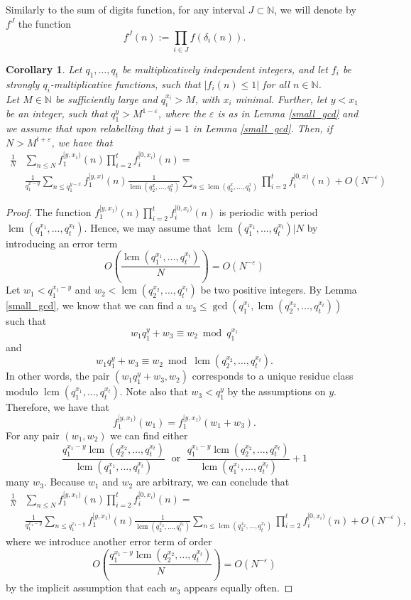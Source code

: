 \documentclass[12pt]{amsart}
\renewcommand{\leq}{\leqslant}
\DeclareMathOperator{\lcm}{lcm}
\newtheorem{corollary}[theorem]{Corollary}
\theoremstyle{definition}
\numberwithin{equation}{section}
\newcommand\NN{\mathbb{N}}
\numberwithin{equation}{section}
\begin{document}
Similarly to the sum of digits function, for any interval $J\subset\NN$, we will denote by $f^J$ the function
\[
	f^J(n):=  \prod_{i\in J}f(\delta_i(n)).
\]  
\begin{corollary}\label{cor_independence}
	Let $q_1,\dots,q_t$ be multiplicatively independent integers, and let $f_i$ be strongly $q_i$-multiplicative functions, such that $|f_i(n)\leq 1|$ for all $n\in \NN$.\\
	Let $M\in \NN$ be sufficiently large and $q_i^{x_i}>M$, with $x_i$ minimal. Further, let $y<x_1$ be an integer, such that $q_1^{y}>M^{1-\varepsilon}$, where the $\varepsilon$ is as in Lemma \ref{small_gcd} and we assume that upon relabelling that $j=1$ in Lemma \ref{small_gcd}. Then, if $N>M^{t+\varepsilon}$, we have that
	\begin{align*}
	    \frac 1N &\sum_{n\leq N}  f_1^{[y,x_1)}(n) \prod_{i=2}^t f_i^{[0,x_i)}(n) = \\
        &\frac 1{q_1^{x-y}}\sum_{n\leq q_1^{y-x}} f_1^{[y,x)}(n) \frac 1{\lcm(q_2^{x},\dots,q_t^{x})}\sum_{n\leq \lcm(q_2^{x},\dots,q_t^{x})} \prod_{i=2}^t f_i^{[0,x)}(n) + O(N^{-\varepsilon})
	\end{align*}
\end{corollary}
\begin{proof}
	The function $f_1^{[y,x_1)}(n) \prod_{i=2}^t f_i^{[0,x_i)}(n)$ is periodic with period $\lcm(q_1^{x_1},\dots,q_t^{x_t})$. Hence, we may assume that $\lcm(q_1^{x_1},\dots,q_t^{x_t})|N$ by introducing an error term
	\[
		O\left(\frac{\lcm(q_1^{x_1},\dots,q_t^{x_t})}{N}\right) = O(N^{-\varepsilon})
	\]
	Let $w_1<q_1^{x_1-y}$ and $w_2<\lcm(q_2^{x_2},\dots,q_t^{x_t})$ be two positive integers. By Lemma \ref{small_gcd}, we know that we can find a $w_3\leq \gcd(q_1^{x_1}, \lcm(q_2^{x_2},\dots,q_t^{x_t}))$ such that
	\[
		w_1q_1^y+w_3 \equiv w_2 \bmod q_1^{x_1}
	\]
	and
	\[
		w_1q_1^y+w_3 \equiv w_2 \bmod \lcm(q_2^{x_2},\dots,q_t^{x_t}).
	\]
	In other words, the pair $(w_1q_1^y+w_3, w_2)$ corresponds to a unique residue class modulo $\lcm(q_1^{x_1},\dots,q_t^{x_t})$. Note also that $w_3<q_1^y$ by the assumptions on $y$. Therefore, we have that 
	\[
		f_1^{[y,x_1)}(w_1)=f_1^{[y,x_1)}(w_1+w_3).
	\]
	For any pair $(w_1,w_2)$ we can find either
	\[
		\frac{q_1^{x_1-y}\lcm(q_2^{x_2},\dots,q_t^{x_t})}{\lcm(q_1^{x_1},\dots,q_t^{x_t})} \; \text{ or } \; 	\frac{q_1^{x_1-y}\lcm(q_2^{x_2},\dots,q_t^{x_t})}{\lcm(q_1^{x_1},\dots,q_t^{x_t})} + 1
	\]
	many $w_3$. Because $w_1$ and $w_2$ are arbitrary, we can conclude that
	\begin{align*}
	    \frac 1N &\sum_{n\leq N}  f_1^{[y,x_1)}(n) \prod_{i=2}^t f_i^{[0,x_i)}(n) =\\
        &\frac 1{q_1^{x_1-y}}\sum_{n\leq q_1^{x_1-y}} f_1^{[y,x_1)}(n) \frac 1{\lcm(q_2^{x_2},\dots,q_t^{x_t})}\sum_{n\leq \lcm(q_2^{x_2},\dots,q_t^{x_t})} \prod_{i=2}^t f_i^{[0,x_i)}(n) + O(N^{-\varepsilon}),
	\end{align*}
	where we introduce another error term of order
	\[
		O\left(\frac{q_1^{x_1-y}\lcm(q_2^{x_2},\dots,q_t^{x_t})}{N}\right)=O(N^{-\varepsilon})
	\]
	by the implicit assumption that each $w_3$ appears equally often.
\end{proof}
\end{document}
